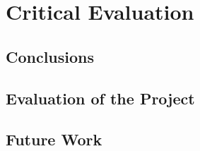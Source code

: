 \chapter{Critical Evaluation}

\section{Conclusions}
\section{Evaluation of the Project}
\section{Future Work}